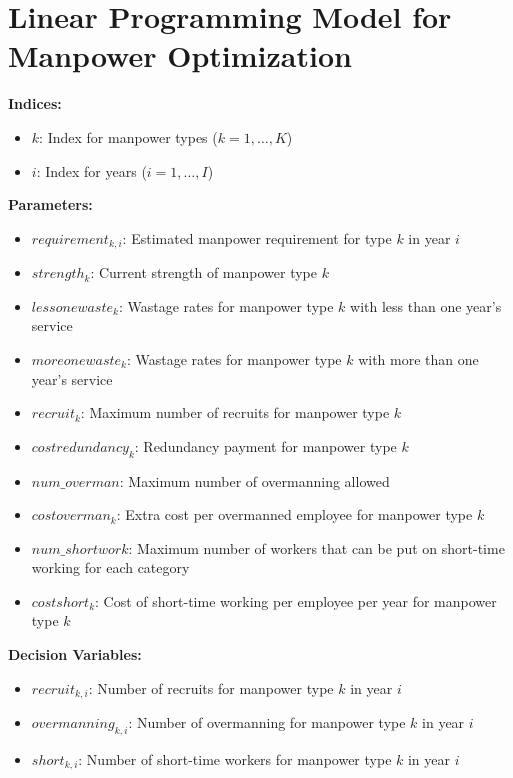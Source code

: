 \documentclass{article}
\begin{document}
\section*{Linear Programming Model for Manpower Optimization}

\textbf{Indices:}
\begin{itemize}
    \item $k$: Index for manpower types ($k = 1, \ldots, K$)
    \item $i$: Index for years ($i = 1, \ldots, I$)
\end{itemize}

\textbf{Parameters:}
\begin{itemize}
    \item $requirement_{k, i}$: Estimated manpower requirement for type $k$ in year $i$
    \item $strength_{k}$: Current strength of manpower type $k$
    \item $lessonewaste_{k}$: Wastage rates for manpower type $k$ with less than one year's service
    \item $moreonewaste_{k}$: Wastage rates for manpower type $k$ with more than one year's service
    \item $recruit_{k}$: Maximum number of recruits for manpower type $k$
    \item $costredundancy_{k}$: Redundancy payment for manpower type $k$
    \item $num\_overman$: Maximum number of overmanning allowed
    \item $costoverman_{k}$: Extra cost per overmanned employee for manpower type $k$
    \item $num\_shortwork$: Maximum number of workers that can be put on short-time working for each category
    \item $costshort_{k}$: Cost of short-time working per employee per year for manpower type $k$
\end{itemize}

\textbf{Decision Variables:}
\begin{itemize}
    \item $recruit_{k, i}$: Number of recruits for manpower type $k$ in year $i$
    \item $overmanning_{k, i}$: Number of overmanning for manpower type $k$ in year $i$
    \item $short_{k, i}$: Number of short-time workers for manpower type $k$ in year $i$
\end{itemize}
\end{document}
